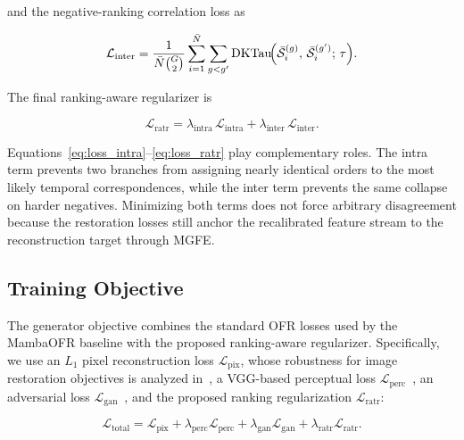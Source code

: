 and the negative-ranking correlation loss as

\begin{equation}
\mathcal{L}_{\text{inter}} =
\frac{1}{\bar{N} \binom{G}{2}}
\sum_{i=1}^{\bar{N}}
\sum_{g < g'}
\mathrm{DKTau}\!\Bigl(
\bar{\mathcal{S}}_i^{(g)},\,
\bar{\mathcal{S}}_i^{(g')};\,
\tau
\Bigr).
\end{equation}

The final ranking-aware regularizer is

\begin{equation}
\mathcal{L}_{\text{ratr}} =
\lambda_{\text{intra}}\,\mathcal{L}_{\text{intra}}
+ \lambda_{\text{inter}}\,\mathcal{L}_{\text{inter}}.
\label{eq:loss_ratr}
\end{equation}

Equations~\eqref{eq:loss_intra}--\eqref{eq:loss_ratr} play complementary roles. The intra term prevents two branches from assigning nearly identical orders to the most likely temporal correspondences, while the inter term prevents the same collapse on harder negatives. Minimizing both terms does not force arbitrary disagreement because the restoration losses still anchor the recalibrated feature stream to the reconstruction target through MGFE.

\subsection{Training Objective}
\label{subsec:training_objective}

The generator objective combines the standard OFR losses used by the MambaOFR baseline with the proposed ranking-aware regularizer. Specifically, we use an $L_1$ pixel reconstruction loss $\mathcal{L}_{\mathrm{pix}}$, whose robustness for image restoration objectives is analyzed in~\cite{zhao2017loss_restoration}, a VGG-based perceptual loss $\mathcal{L}_{\mathrm{perc}}$~\cite{johnson2016perceptual}, an adversarial loss $\mathcal{L}_{\mathrm{gan}}$~\cite{goodfellow2014gan}, and the proposed ranking regularization $\mathcal{L}_{\mathrm{ratr}}$:

\begin{equation}
\mathcal{L}_{\mathrm{total}} =
\mathcal{L}_{\mathrm{pix}}
+ \lambda_{\mathrm{perc}}\mathcal{L}_{\mathrm{perc}}
+ \lambda_{\mathrm{gan}}\mathcal{L}_{\mathrm{gan}}
+ \lambda_{\mathrm{ratr}}\mathcal{L}_{\mathrm{ratr}}.
\label{eq:loss_total}
\end{equation}

